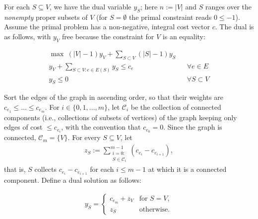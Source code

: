 \documentclass[11pt,letterpaper]{article}
\newtheorem{lemma}[theorem]{Lemma}
\theoremstyle{definition}
\newcommand{\calC}{\mathcal{C}}
\begin{document}


For each $S\subseteq V$, we have the dual variable $y_S$; here $n:=|V|$ and $S$ ranges over the
\emph{nonempty} proper subsets of $V$ (for $S=\emptyset$ the primal constraint reads $0\leq -1$).
Assume the primal problem has a non-negative, integral cost vector $c$.
The dual is as follows, with $y_V$ free because the constraint for $V$ is an equality:

\begin{align*}
    \max \ (|V|-1)y_V +\sum_{S\subset V} (|S|-1)y_S\\
    y_V + \sum_{S\subset V:e\in E(S)} y_S\leq c_e && \forall e\in E \\
    y_S\leq 0 && \forall S\subset V 
\end{align*}

Sort the edges of the graph in ascending order, so that their weights are $c_{e_1}\leq \dots \leq c_{e_m}$.
For $i\in \{0,1,\dots,m\}$, let $\calC_i$ be the collection of connected components (i.e., collections of subsets of vertices) of the graph keeping only edges of cost $\leq c_{e_i}$, with the convention that $c_{e_0}=0$.
Since the graph is connected, $\calC_m=\{V\}$.
For every $S\subseteq V$, let
\begin{align*}
    z_S := \sum_{\substack{i=0:\\ S\in \calC_i}}^{m-1} \left(c_{e_{i}}-c_{e_{i+1}}\right),
\end{align*}
that is, $S$ collects $c_{e_{i}}-c_{e_{i+1}}$ for each $i\leq m-1$ at which it is a connected component.
Define a dual solution as follows:

\begin{align*}
    y_S =\begin{cases}
        c_{e_m} + z_V &\text{for }S=V, \\
        z_S &\text{otherwise}.
    \end{cases}
\end{align*}
\end{document}
